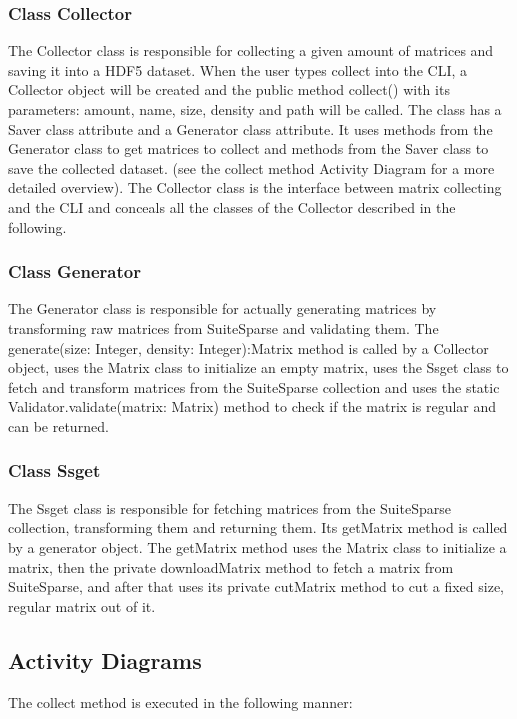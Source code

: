 \documentclass[parskip=full]{scrartcl}
\begin{document}
\subsubsection{Class Collector}
The Collector class is responsible for collecting a given amount of matrices and saving it into a HDF5 dataset.
When the user types collect into the CLI, a Collector object will be created and the public method collect() with its parameters:
amount, name, size, density and path
will be called. 
The class has a Saver class attribute and a Generator class attribute.
It uses methods from the Generator class to get matrices to collect and methods from the Saver class to save the collected dataset.
(see the collect method Activity Diagram for a more detailed overview).
The Collector class is the interface between matrix collecting and the CLI and conceals all the classes of the Collector described in the following.

\subsubsection{Class Generator}
The Generator class is responsible for actually generating matrices by transforming raw matrices from SuiteSparse and validating them.
The generate(size: Integer, density: Integer):Matrix method is called by a Collector object, uses the Matrix class to initialize an empty matrix, uses the Ssget class to fetch and transform matrices from the SuiteSparse collection and uses the static Validator.validate(matrix: Matrix)  method to check if the matrix is regular and can be returned.

\subsubsection{Class Ssget}
The Ssget class is responsible for fetching matrices from the SuiteSparse collection, transforming them and returning them.
Its getMatrix method is called by a generator object.
The getMatrix method uses the Matrix class to initialize a matrix, then the private downloadMatrix method to fetch a matrix from SuiteSparse, and after that uses its private cutMatrix method to cut a fixed size, regular matrix out of it.

\subsection{Activity Diagrams}
The collect method is executed in the following manner:
\newpage
\begin{figure}[h]
\begin{center}

\label{Activity Diagrams}
\end{center}
\end{figure}
\newpage
\end{document}
